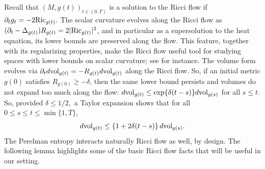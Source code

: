 \documentclass[11pt,reqno]{amsart}
\theoremstyle{remark}
\theoremstyle{definition}
\numberwithin{equation}{section}
\newcommand{\Ric}{{\rm{Ric}}}
\newcommand{\vol}{{\rm{vol}}}
\begin{document}
Recall that $(M, g(t))_{t \in (0,T)}$ is a solution to the Ricci flow if 
$\partial_t g_t = -2\Ric_{g(t)}.$ 
The scalar curvature evolves along the Ricci flow as $(\partial_t -\Delta_{g(t)})R_{g(t)} = 2|\Ric_{g(t)}|^2$, and in particular as a supersolution to the heat equation, its lower bounds are preserved along the flow. This feature, together with its regularizing properties, make the Ricci flow
useful tool for studying spaces with lower bounds on scalar curvature; see \cite{LNN1, Bamler1, PBG1, PBG2} for instance.  The volume form evolves via $\partial_t d\vol_{g(t)} = -R_{g(t)} d\vol_{g(t)}$ along the Ricci flow. So, if an initial metric $g(0)$ satisfies $R_{g(0)}\geq -\delta$, then the same lower bound persists and volumes do not expand too much along the flow: $
 	d\vol_{g(t)}\leq \exp\{\delta(t-s)\}d\vol_{g(s)}$ for all $s \leq t.$ So, provided $\delta\leq 1/2,$  a Taylor expansion shows that for all $ 0\leq s \leq t\leq \min\{1,T\}$, 
 	\begin{equation}
 	\label{eqn: volume forms}
 	d\vol_{g(t)}\leq \left\{1+2\delta(t-s)\right\}d\vol_{g(s)}. 
 \end{equation} 
The Perelman entropy interacts naturally Ricci flow as well, by design. The following lemma highlights some of the basic Ricci flow facts that will be useful in our setting.
\end{document}
